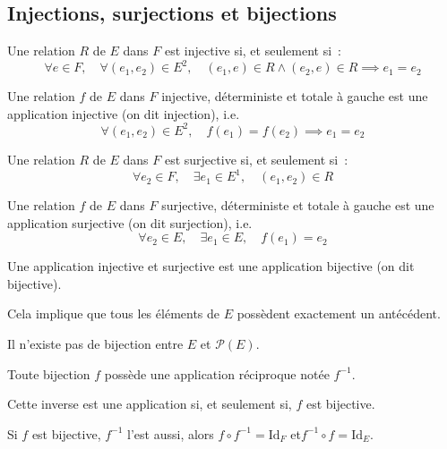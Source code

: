 \documentclass[a4paper, titlepage]{article}
\begin{document}
    \subsection{Injections, surjections et bijections}
    \begin{defn}
        Une relation $R$ de $E$ dans $F$ est injective si, et seulement si~:
        $$ \forall e\in F,\quad\forall (e_1,e_2)\in E^2,\quad(e_1,e)\in R\land(e_2,e)\in R\implies e_1=e_2 $$
    \end{defn}
    \begin{defn}
        Une relation $f$ de $E$ dans $F$ injective, déterministe et totale à gauche est une application injective (on
        dit injection), i.e.
        $$ \forall (e_1,e_2)\in E^2,\quad f(e_1)=f(e_2)\implies e_1=e_2 $$
    \end{defn}
    \begin{defn}
        Une relation $R$ de $E$ dans $F$ est surjective si, et seulement si~:
        $$ \forall e_2\in F,\quad\exists e_1\in E^1,\quad(e_1,e_2)\in R $$
    \end{defn}
    \begin{defn}
        Une relation $f$ de $E$ dans $F$ surjective, déterministe et totale à gauche est une application surjective (on
        dit surjection), i.e.
        $$ \forall e_2\in E,\quad \exists e_1\in E,\quad f(e_1)=e_2 $$
    \end{defn}
    \begin{defn}
        Une application injective et surjective est une application bijective (on dit bijective).

        Cela implique que tous les éléments de $E$ possèdent exactement un antécédent.
    \end{defn}
    \begin{thm}
        Il n'existe pas de bijection entre $E$ et $\mathcal{P}(E)$.
    \end{thm}
    \begin{props}
        Toute bijection $f$ possède une application réciproque notée $f^{-1}$.

        Cette inverse est une application si, et seulement si, $f$ est bijective.

        Si $f$ est bijective, $f^{-1}$ l'est aussi, alors $f\circ f^{-1} = \mathrm{Id}_F$ et$f^{-1}\circ f = \mathrm{Id}_E$.
    \end{props}
\end{document}
